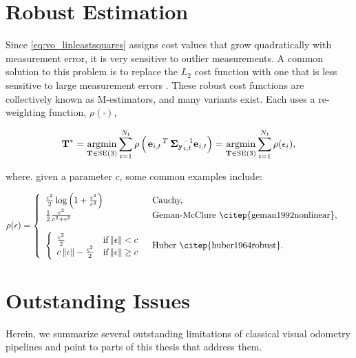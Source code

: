 \section{Robust Estimation}
Since \cref{eq:vo_linleastsquares} assigns cost values that grow quadratically with measurement error, it is very sensitive to outlier measurements.
A common solution to this problem is to replace the $L_2$ cost function with one that is less sensitive to large measurement errors \citep{MacTavish2015-wt}.
These robust cost functions are collectively known as M-estimators, and many variants exist. Each uses a re-weighting function, $\rho(\cdot)$,

\begin{equation}
  \boldsymbol{\mathbf{T}}^* = \operatorname*{argmin}_{\boldsymbol{\mathbf{T}}\in\text{SE}(3)}\sum_{i=1}^{N_t} 
  \rho\left(\left.{\boldsymbol{\mathbf{e}}_{i,t}}\right.^T \boldsymbol{\mathbf{\Sigma_y}}_{i,t}^{-1} \boldsymbol{\mathbf{e}}_{i,t}\right) = \operatorname*{argmin}_{\boldsymbol{\mathbf{T}}\in\text{SE}(3)}\sum_{i=1}^{N_t} 
  \rho(\epsilon_i),
\end{equation}

where. given a parameter $c$, some common examples include:

\begin{align}
\rho(\epsilon) &= \left\{  	\begin{array}{ll}
		 \frac{c^2}{2} \log{\left(1 + \frac{\epsilon^2}{c^2}\right)}   & \mbox{Cauchy,} \\
		 \frac{1}{2} \frac{\epsilon^2}{c^2 + \epsilon^2}  & \mbox{Geman-McClure \citep{geman1992nonlinear},} \\
		 \\
		\left\{  	\begin{array}{ll}  \frac{\epsilon^2}{2} & \mbox{if} \Norm{\epsilon} < c \\
										c\Norm{\epsilon} - \frac{c^2}{2} & \mbox{if} \Norm{\epsilon} \geq c \end{array}
																						 \right.   & \mbox{Huber \citep{huber1964robust}.} \\
	\end{array}
	\right.
\end{align}




\section{Outstanding Issues}
Herein, we summarize several outstanding limitations of classical visual odometry pipelines and point to parts of this thesis that address them.

